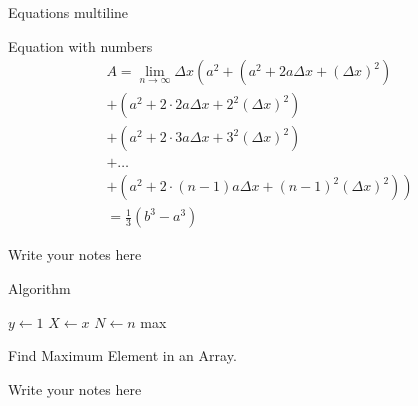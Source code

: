 \documentclass{beamer}
\begin{document}
    \begin{frame}{Equations multiline}
       \begin{exampleblock}{Equation with numbers}
            \begin{multline}
                A=\lim_{n\rightarrow\infty}\Delta x\left(a^{2}+\left(a^{2}+2a\Delta x+\left(\Delta x\right)^{2}\right)\right.\label{eq:reset}\\
                +\left(a^{2}+2\cdot2a\Delta x+2^{2}\left(\Delta x\right)^{2}\right)\\
                +\left(a^{2}+2\cdot3a\Delta x+3^{2}\left(\Delta x\right)^{2}\right)\\
                +\ldots\\
                \left.+\left(a^{2}+2\cdot(n-1)a\Delta x+(n-1)^{2}\left(\Delta x\right)^{2}\right)\right)\\
                =\frac{1}{3}\left(b^{3}-a^{3}\right)
            \end{multline}
        \end{exampleblock}

        \begin{note}
            {Write your notes here}
        \end{note}
    \end{frame}

    \begin{frame}{Algorithm}
        \begin{algorithm}[H]
            \footnotesize
            \DontPrintSemicolon
            
            
            
            $y \gets 1$\;
            $X \gets x$\;
            $N \gets n$\;
            \Return max\;
            \caption{Find Maximum Element in an Array.}
            \label{tab:algorithm_new}
        \end{algorithm}
        
        \begin{note}
            {Write your notes here}
        \end{note}
    \end{frame}
\end{document}
